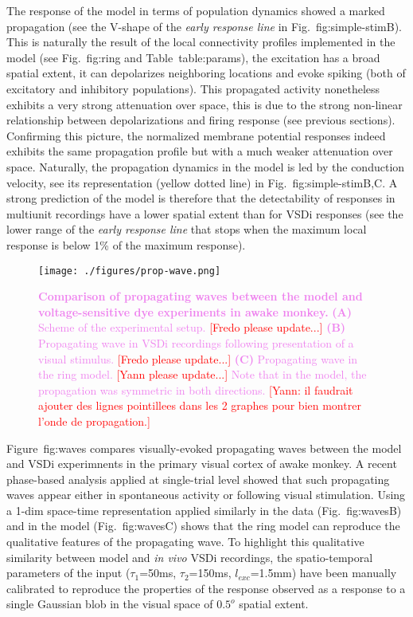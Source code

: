 \documentclass[8pt, colorlinks, a4paper]{article}
\renewcommand\ref{}
\newcommand{\remark}[1]{{\textcolor{red}{#1}}}
\newcommand{\corr}[1]{{\textcolor{violet}{#1}}}
\begin{document}
The response of the model in terms of population dynamics showed a
marked propagation (see the V-shape of the \emph{early response line}
in Fig.~\ref{fig:simple-stim}B). This is naturally the result of the
local connectivity profiles implemented in the model (see
Fig.~\ref{fig:ring} and Table~\ref{table:params}), the excitation has
a broad spatial extent, it can depolarizes neighboring locations and
evoke spiking (both of excitatory and inhibitory populations). This
propagated activity nonetheless exhibits a very strong attenuation
over space, this is due to the strong non-linear relationship between
depolarizations and firing response (see previous
sections). Confirming this picture, the normalized membrane potential
responses indeed exhibits the same propagation profile but with a much
weaker attenuation over space.  Naturally, the propagation dynamics in
the model is led by the conduction velocity, see its representation
(yellow dotted line) in Fig.~\ref{fig:simple-stim}B,C. A strong
prediction of the model is therefore that the detectability of
responses in multiunit recordings have a lower spatial extent than for
VSDi responses (see the lower range of the \emph{early response line}
that stops when the maximum local response is below 1\% of the maximum
response).

\begin{figure}[tb!]
\centering
\texttt{[image: ./figures/prop-wave.png]}

\caption{\label{fig:waves}\corr{\textbf{Comparison of propagating
      waves between the model and voltage-sensitive dye experiments in
      awake monkey.} \textbf{(A)} Scheme of the experimental setup.
    \remark{[Fredo please update...]} \textbf{(B)} Propagating wave in
    VSDi recordings following presentation of a visual stimulus.
    \remark{[Fredo please update...]}  \textbf{(C)} Propagating wave
    in the ring model.  \remark{[Yann please update...]} Note that in
    the model, the propagation was symmetric in both directions.
    \remark{[Yann: il faudrait ajouter des lignes pointillees dans les
      2 graphes pour bien montrer l'onde de propagation.]}  }}

\end{figure}

Figure~\ref{fig:waves} compares visually-evoked propagating waves
between the model and VSDi experimnents in the primary visual cortex
of awake monkey.  A recent phase-based analysis applied at
single-trial level \cite{Muller2014} showed that such propagating
waves appear either in spontaneous activity or following visual
stimulation.  Using a 1-dim space-time representation applied
similarly in the data (Fig.~\ref{fig:waves}B) and in the model
(Fig.~\ref{fig:waves}C) shows that the ring model can reproduce the
qualitative features of the propagating wave.  To highlight this
qualitative similarity between model and \emph{in vivo} VSDi
recordings, the spatio-temporal parameters of the input
(\(\tau_1\)=50ms, \(\tau_2\)=150ms, \(l_{exc}\)=1.5mm) have been
manually calibrated to reproduce the properties of the response
observed as a response to a single Gaussian blob in the visual space
of \(0.5^o\) spatial extent.
\end{document}

